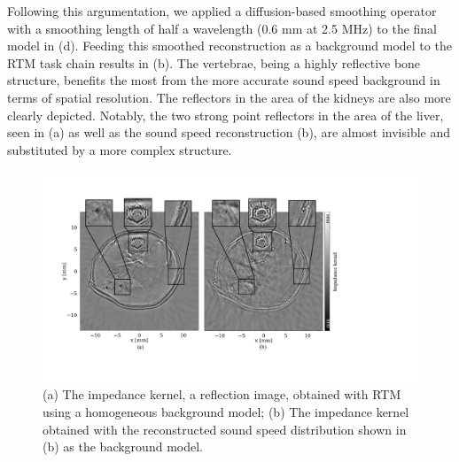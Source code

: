 \documentclass[12pt]{iopart}
\begin{document}
Following this argumentation, we applied a diffusion-based smoothing operator with a smoothing length of half a wavelength (0.6 mm at 2.5 MHz) to the final model in (d). Feeding this smoothed reconstruction as a background model to the RTM task chain results in (b). The vertebrae, being a highly reflective bone structure, benefits the most from the more accurate sound speed background in terms of spatial resolution. The reflectors in the area of the kidneys are also more clearly depicted. Notably, the two strong point reflectors in the area of the liver, seen in (a) as well as the sound speed reconstruction (b), are almost invisible and substituted by a more complex structure. 
\begin{figure}[!h]
    \centering
    \includegraphics[width=\textwidth]{figure5.pdf}
    \caption{(a) The impedance kernel, a reflection image, obtained with RTM using a homogeneous background model; (b) The impedance kernel obtained with the reconstructed sound speed distribution shown in (b) as the background model.}
    \label{fig:Comparisonfig_RTM}
\end{figure}

\end{document}
